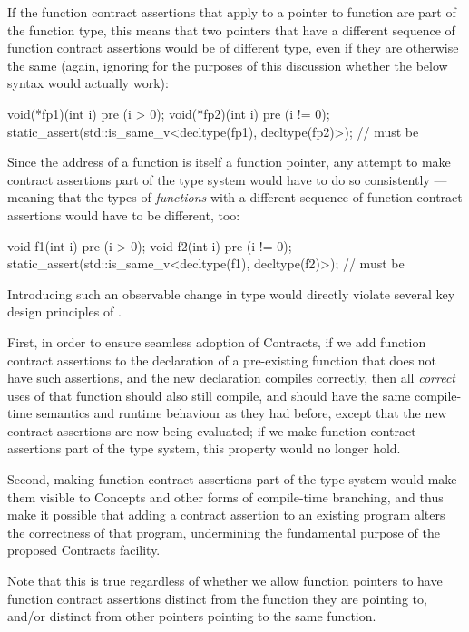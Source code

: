 If the function contract assertions that apply to a pointer to function are part of the function type, this means that two pointers that have a different sequence of function contract assertions would be of different type, even if they are otherwise the same (again, ignoring for the purposes of this discussion whether the below syntax would actually work):
\begin{codeblock}
void(*fp1)(int i) pre (i > 0);
void(*fp2)(int i) pre (i != 0);
static_assert(std::is_same_v<decltype(fp1), decltype(fp2)>);  // must be 
\end{codeblock}
Since the address of a function is itself a function pointer, any attempt to make contract assertions part of the type system would have to do so consistently --- meaning that the types of \emph{functions} with a different sequence of function contract assertions would have to be different, too:
\begin{codeblock}
void f1(int i) pre (i > 0);
void f2(int i) pre (i != 0);
static_assert(std::is_same_v<decltype(f1), decltype(f2)>);  // must be 
\end{codeblock}
Introducing such an observable change in type would directly violate several key design principles of \cite{P2900R7}.

First, in order to ensure seamless adoption of Contracts, if we add function contract assertions to the declaration of a pre-existing function that does not have such assertions, and the new declaration compiles correctly, then all \emph{correct} uses of that function should also still compile, and should have the same compile-time semantics and runtime behaviour as they had before, except that the new contract assertions are now being evaluated; if we make function contract assertions part of the type system, this property would no longer hold.

Second, making function contract assertions part of the type system would make them visible to Concepts and other forms of compile-time branching, and thus make it possible that adding a contract assertion to an existing program alters the correctness of that program, undermining the fundamental purpose of the proposed Contracts facility.

Note that this is true regardless of whether we allow function pointers to have function contract assertions distinct from the function they are pointing to, and/or distinct from other pointers pointing to the same function.

